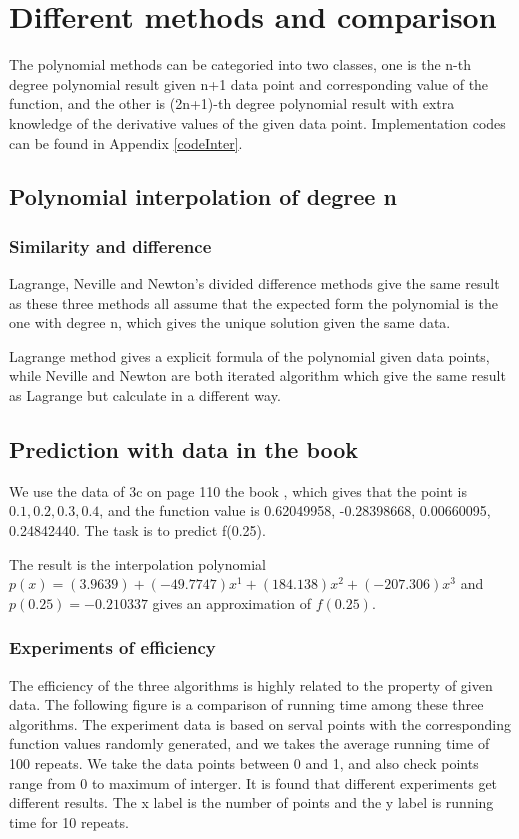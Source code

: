 \documentclass[12pt]{article}
\begin{document}
\section{Different methods and comparison}
The polynomial methods can be categoried into two classes, one is the n-th degree polynomial result given n+1 data point and corresponding value of the function, and the other is (2n+1)-th degree polynomial result with extra knowledge of the derivative values of the given data point. Implementation codes can be found in Appendix \ref{codeInter}.

\subsection{Polynomial interpolation of degree n}

\subsubsection{Similarity and difference}
Lagrange, Neville and Newton's divided difference methods give the same result as these three methods all assume that the expected form the polynomial is the one with degree n, which gives the unique solution given the same data.

Lagrange method gives a explicit formula of the polynomial given data points, while Neville and Newton are both iterated algorithm which give the same result as Lagrange but calculate in a different way.

\subsection{Prediction with data in the book}
We use the data of 3c on page 110 the book \cite{1}, which gives that the point is $0.1, 0.2, 0.3, 0.4$, and the function value is 0.62049958, -0.28398668, 0.00660095, 0.24842440. The task is to predict f(0.25).

The result is the interpolation polynomial $p(x)=(3.9639)+(-49.7747)x^1+(184.138)x^2+(-207.306)x^3$ and $p(0.25)=-0.210337$ gives an approximation of $f(0.25)$.

\subsubsection{Experiments of efficiency}

The efficiency of the three algorithms is highly related to the property of given data. The following figure is a comparison of running time among these three algorithms. The experiment data is based on serval points with the corresponding function values randomly generated, and we takes the average running time of 100 repeats. We take the data points between 0 and 1, and also check points range from 0 to maximum of interger. It is found that different experiments get different results. The x label is the number of points and the y label is running time for 10 repeats.
\end{document}
